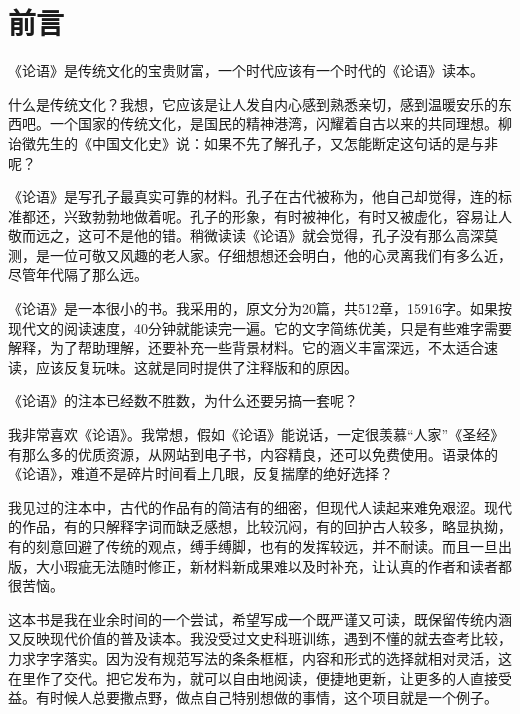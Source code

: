 \chapter*{前\qquad 言}

《论语》是传统文化的宝贵财富，一个时代应该有一个时代的《论语》读本。

什么是传统文化？我想，它应该是让人发自内心感到熟悉亲切，感到温暖安乐的东西吧。一个国家的传统文化，是国民的精神港湾，闪耀着自古以来的共同理想。柳诒徵先生的《中国文化史》说：如果不先了解孔子，又怎能断定这句话的是与非呢？

《论语》是写孔子最真实可靠的材料。孔子在古代被称为，他自己却觉得，连的标准都还，兴致勃勃地做着呢。孔子的形象，有时被神化，有时又被虚化，容易让人敬而远之，这可不是他的错。稍微读读《论语》就会觉得，孔子没有那么高深莫测，是一位可敬又风趣的老人家。仔细想想还会明白，他的心灵离我们有多么近，尽管年代隔了那么远。

《论语》是一本很小的书。我采用的，原文分为20篇，共512章，15916字。如果按现代文的阅读速度，40分钟就能读完一遍。它的文字简练优美，只是有些难字需要解释，为了帮助理解，还要补充一些背景材料。它的涵义丰富深远，不太适合速读，应该反复玩味。这就是同时提供了注释版和的原因。

《论语》的注本已经数不胜数，为什么还要另搞一套呢？

我非常喜欢《论语》。我常想，假如《论语》能说话，一定很羡慕“人家”《圣经》有那么多的优质资源，从网站到电子书，内容精良，还可以免费使用。语录体的《论语》，难道不是碎片时间看上几眼，反复揣摩的绝好选择？

我见过的注本中，古代的作品有的简洁有的细密，但现代人读起来难免艰涩。现代的作品，有的只解释字词而缺乏感想，比较沉闷，有的回护古人较多，略显执拗，有的刻意回避了传统的观点，缚手缚脚，也有的发挥较远，并不耐读。而且一旦出版，大小瑕疵无法随时修正，新材料新成果难以及时补充，让认真的作者和读者都很苦恼。

这本书是我在业余时间的一个尝试，希望写成一个既严谨又可读，既保留传统内涵又反映现代价值的普及读本。我没受过文史科班训练，遇到不懂的就去查考比较，力求字字落实。因为没有规范写法的条条框框，内容和形式的选择就相对灵活，这在里作了交代。把它发布为，就可以自由地阅读，便捷地更新，让更多的人直接受益。有时候人总要撒点野，做点自己特别想做的事情，这个项目就是一个例子。

